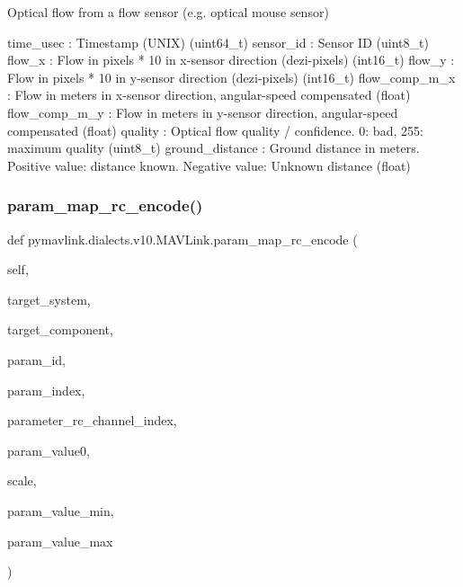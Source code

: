 \begin{DoxyVerb}
\begin{DoxyVerb}
\begin{DoxyVerb}
\begin{DoxyVerb}
\begin{DoxyVerb}Optical flow from a flow sensor (e.g. optical mouse sensor)

time_usec                 : Timestamp (UNIX) (uint64_t)
sensor_id                 : Sensor ID (uint8_t)
flow_x                    : Flow in pixels * 10 in x-sensor direction (dezi-pixels) (int16_t)
flow_y                    : Flow in pixels * 10 in y-sensor direction (dezi-pixels) (int16_t)
flow_comp_m_x             : Flow in meters in x-sensor direction, angular-speed compensated (float)
flow_comp_m_y             : Flow in meters in y-sensor direction, angular-speed compensated (float)
quality                   : Optical flow quality / confidence. 0: bad, 255: maximum quality (uint8_t)
ground_distance           : Ground distance in meters. Positive value: distance known. Negative value: Unknown distance (float)\end{DoxyVerb}
 \mbox{\label{classpymavlink_1_1dialects_1_1v10_1_1MAVLink_aeaa52a90f587891cf4510eb63f827ada}} 
\subsubsection{\texorpdfstring{param\+\_\+map\+\_\+rc\+\_\+encode()}{param\_map\_rc\_encode()}}
{\footnotesize\ttfamily def pymavlink.\+dialects.\+v10.\+M\+A\+V\+Link.\+param\+\_\+map\+\_\+rc\+\_\+encode (\begin{DoxyParamCaption}\item[{}]{self,  }\item[{}]{target\+\_\+system,  }\item[{}]{target\+\_\+component,  }\item[{}]{param\+\_\+id,  }\item[{}]{param\+\_\+index,  }\item[{}]{parameter\+\_\+rc\+\_\+channel\+\_\+index,  }\item[{}]{param\+\_\+value0,  }\item[{}]{scale,  }\item[{}]{param\+\_\+value\+\_\+min,  }\item[{}]{param\+\_\+value\+\_\+max }\end{DoxyParamCaption})}


\end{DoxyVerb}
\end{DoxyVerb}
\end{DoxyVerb}
\end{DoxyVerb}
